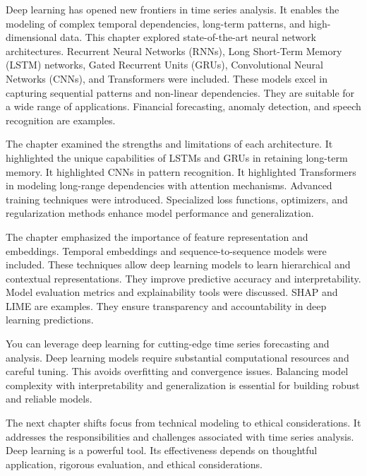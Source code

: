 Deep learning has opened new frontiers in time series analysis. It enables the modeling of complex temporal dependencies, long-term patterns, and high-dimensional data. This chapter explored state-of-the-art neural network architectures. Recurrent Neural Networks (RNNs), Long Short-Term Memory (LSTM) networks, Gated Recurrent Units (GRUs), Convolutional Neural Networks (CNNs), and Transformers were included. These models excel in capturing sequential patterns and non-linear dependencies. They are suitable for a wide range of applications. Financial forecasting, anomaly detection, and speech recognition are examples.

The chapter examined the strengths and limitations of each architecture. It highlighted the unique capabilities of LSTMs and GRUs in retaining long-term memory. It highlighted CNNs in pattern recognition. It highlighted Transformers in modeling long-range dependencies with attention mechanisms. Advanced training techniques were introduced. Specialized loss functions, optimizers, and regularization methods enhance model performance and generalization.

The chapter emphasized the importance of feature representation and embeddings. Temporal embeddings and sequence-to-sequence models were included. These techniques allow deep learning models to learn hierarchical and contextual representations. They improve predictive accuracy and interpretability. Model evaluation metrics and explainability tools were discussed. SHAP and LIME are examples. They ensure transparency and accountability in deep learning predictions.

You can leverage deep learning for cutting-edge time series forecasting and analysis. Deep learning models require substantial computational resources and careful tuning. This avoids overfitting and convergence issues. Balancing model complexity with interpretability and generalization is essential for building robust and reliable models.

The next chapter shifts focus from technical modeling to ethical considerations. It addresses the responsibilities and challenges associated with time series analysis. Deep learning is a powerful tool. Its effectiveness depends on thoughtful application, rigorous evaluation, and ethical considerations.


